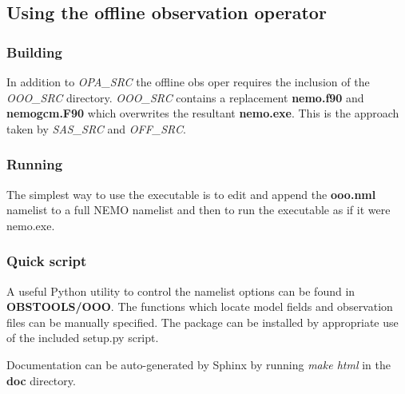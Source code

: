 
\subsection{Using the offline observation operator}

\subsubsection{Building}

In addition to \emph{OPA\_SRC} the offline obs oper requires the inclusion
of the \emph{OOO\_SRC} directory. \emph{OOO\_SRC} contains a replacement \textbf{nemo.f90} and
\textbf{nemogcm.F90} which overwrites the resultant \textbf{nemo.exe}. This is the approach taken
by \emph{SAS\_SRC} and \emph{OFF\_SRC}.

\subsubsection{Running}

The simplest way to use the executable is to edit and append the \textbf{ooo.nml} namelist to
a full NEMO namelist and then to run the executable as if it were nemo.exe. 

\subsubsection{Quick script}

A useful Python utility to control the namelist options can be found in \textbf{OBSTOOLS/OOO}. The
functions which locate model fields and observation files can be manually specified. The package
can be installed by appropriate use of the included setup.py script.

Documentation can be auto-generated by Sphinx by running \emph{make html} in the \textbf{doc} directory.

